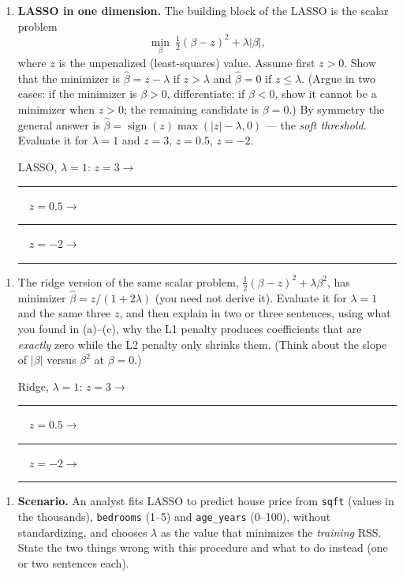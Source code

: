 \documentclass[
  11pt,
]{article}
\providecommand{\tightlist}{%
  \setlength{\itemsep}{0pt}\setlength{\parskip}{0pt}}
\newcommand{\answerspace}[1]{\par\vspace*{#1}}  %
\newcommand{\blank}[1][1.2in]{\rule{#1}{0.4pt}}
\newcommand{\answerpage}{\clearpage}
\begin{document}
\begin{enumerate}
\def\labelenumi{(\alph{enumi})}
\setcounter{enumi}{1}
\item
  \textbf{LASSO in one dimension.} The building block of the LASSO is
  the scalar problem
  \[\min_\beta\ \tfrac12(\beta - z)^2 + \lambda|\beta|,\] where \(z\) is
  the unpenalized (least-squares) value. Assume first \(z > 0\). Show
  that the minimizer is \(\hat\beta = z - \lambda\) if \(z > \lambda\)
  and \(\hat\beta = 0\) if \(z \le \lambda\). (Argue in two cases: if
  the minimizer is \(\beta > 0\), differentiate; if \(\beta<0\), show it
  cannot be a minimizer when \(z>0\); the remaining candidate is
  \(\beta = 0\).) By symmetry the general answer is
  \(\hat\beta = \operatorname{sign}(z)\max(|z|-\lambda, 0)\) --- the
  \emph{soft threshold}. Evaluate it for \(\lambda = 1\) and \(z = 3\),
  \(z = 0.5\), \(z = -2\).

  LASSO, \(\lambda=1\): \(z=3 \to\) \blank[0.8in] \(\quad z=0.5 \to\)
  \blank[0.8in] \(\quad z=-2 \to\) \blank[0.8in]
\end{enumerate}

\answerspace{3in}

\begin{enumerate}
\def\labelenumi{(\alph{enumi})}
\setcounter{enumi}{2}
\item
  The ridge version of the same scalar problem,
  \(\tfrac12(\beta - z)^2 + \lambda\beta^2\), has minimizer
  \(\hat\beta = z/(1+2\lambda)\) (you need not derive it). Evaluate it
  for \(\lambda = 1\) and the same three \(z\), and then explain in two
  or three sentences, using what you found in (a)--(c), why the L1
  penalty produces coefficients that are \emph{exactly} zero while the
  L2 penalty only shrinks them. (Think about the slope of \(|\beta|\)
  versus \(\beta^2\) at \(\beta = 0\).)

  Ridge, \(\lambda=1\): \(z=3 \to\) \blank[0.8in] \(\quad z=0.5 \to\)
  \blank[0.8in] \(\quad z=-2 \to\) \blank[0.8in]
\end{enumerate}

\answerspace{2in}
\answerpage

\begin{enumerate}
\def\labelenumi{(\alph{enumi})}
\setcounter{enumi}{3}
\tightlist
\item
  \textbf{Scenario.} An analyst fits LASSO to predict house price from
  \texttt{sqft} (values in the thousands), \texttt{bedrooms} (1--5) and
  \texttt{age\_years} (0--100), without standardizing, and chooses
  \(\lambda\) as the value that minimizes the \emph{training} RSS. State
  the two things wrong with this procedure and what to do instead (one
  or two sentences each).
\end{enumerate}
\end{document}
